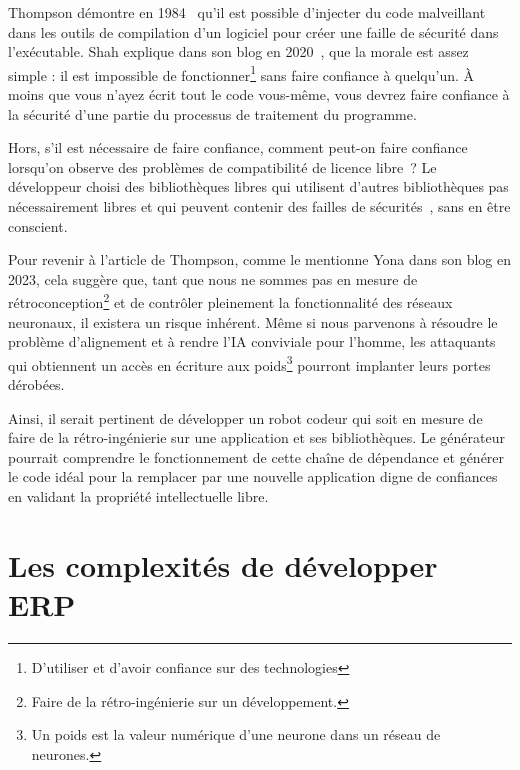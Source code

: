 Thompson démontre en 1984~\cite{thompson_trusting_1984} qu'il est possible d'injecter du code malveillant dans les outils de compilation d'un logiciel pour créer une faille de sécurité dans l'exécutable. Shah explique dans son blog en 2020~\cite{discussion_reflection_trusting_2020}, que la morale est assez simple : il est impossible de fonctionner\footnote{D'utiliser et d'avoir confiance sur des technologies} sans faire confiance à quelqu'un. À moins que vous n'ayez écrit tout le code vous-même, vous devrez faire confiance à la sécurité d'une partie du processus de traitement du programme.

Hors, s'il est nécessaire de faire confiance, comment peut-on faire confiance lorsqu'on observe des problèmes de compatibilité de licence libre~\cite{pfeiffer2022license}\cite{8667977}? Le développeur choisi des bibliothèques libres qui utilisent d'autres bibliothèques pas nécessairement libres et qui peuvent contenir des failles de sécurités~\cite{10.1145/3133956.3134048}, sans en être conscient. 

Pour revenir à l'article de Thompson, comme le mentionne Yona dans son blog en 2023, cela suggère que, tant que nous ne sommes pas en mesure de rétroconception\footnote{Faire de la rétro-ingénierie sur un développement.} et de contrôler pleinement la fonctionnalité des réseaux neuronaux, il existera un risque inhérent. Même si nous parvenons à résoudre le problème d'alignement et à rendre l'IA conviviale pour l'homme, les attaquants qui obtiennent un accès en écriture aux poids\footnote{Un poids est la valeur numérique d'une neurone dans un réseau de neurones.} pourront implanter leurs portes dérobées.~\cite{discussion_reflection_trusting_ia_2023}

Ainsi, il serait pertinent de développer un robot codeur qui soit en mesure de faire de la rétro-ingénierie sur une application et ses bibliothèques. Le générateur pourrait comprendre le fonctionnement de cette chaîne de dépendance et générer le code idéal pour la remplacer par une nouvelle application digne de confiances en validant la propriété intellectuelle libre.

\section{Les complexités de développer ERP}


